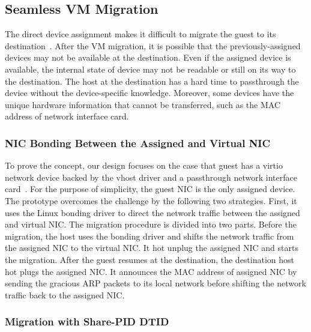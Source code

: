 \subsection{Seamless VM Migration}
The direct device assignment makes it difficult to migrate the
guest to its destination~\cite{zhai:2008}. After the VM
migration, it is possible that the previously-assigned devices
may not be available at the destination. Even if the assigned
device is available, the internal state of device may not be
readable or still on its way to the destination. The host at
the destination has a hard time to passthrough the device
without the device-specific knowledge. Moreover, some devices
have the unique hardware information that cannot be
transferred, such as the MAC address of network interface
card.

\subsubsection{NIC Bonding Between the Assigned and Virtual NIC}
To prove the concept, our design focuses on the case that
guest has a virtio network device backed by the vhost driver
and a passthrough network interface card~\cite{zhai:2008}. For
the purpose of simplicity, the guest NIC is the only assigned
device. The prototype overcomes the challenge by the following
two strategies. First, it uses the Linux bonding driver to
direct the network traffic between the assigned and virtual
NIC. The migration procedure is divided into two parts. Before
the migration, the host uses the bonding driver and shifts the
network traffic from the assigned NIC to the virtual NIC. It
hot unplug the assigned NIC and starts the migration. After
the guest resumes at the destination, the destination host hot
plugs the assigned NIC. It announces the MAC address of
assigned NIC by sending the gracious ARP packets to its local
network before shifting the network traffic back to the
assigned NIC.


\subsubsection{Migration with Share-PID DTID}

